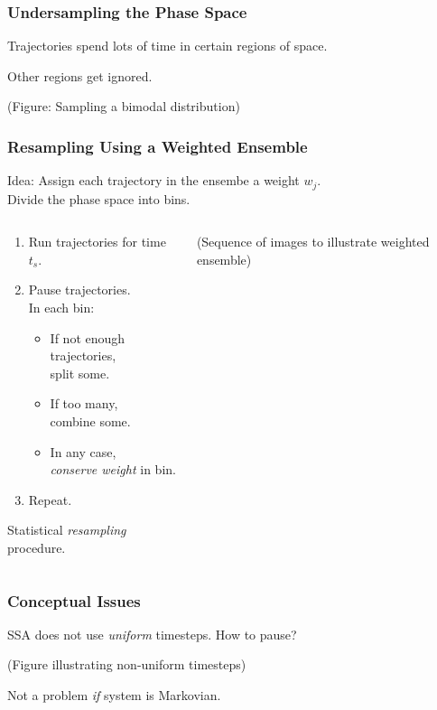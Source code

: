 \documentclass[xcolor={usenames,dvipsnames,svgnames}]{beamer}
\begin{document}
\begin{frame}
    \frametitle{Undersampling the Phase Space}
    Trajectories spend lots of time in certain regions of space.

    Other regions get ignored.

    (Figure: Sampling a bimodal distribution)
\end{frame}

\begin{frame}
    \frametitle{Resampling Using a Weighted Ensemble}
    Idea: Assign each trajectory in the ensembe a weight $w_j$.\\
    Divide the phase space into bins.
    \begin{columns}[c]
        \begin{column}{0.5\textwidth}
            \begin{enumerate}
                \item Run trajectories for time $t_s$.
                \item Pause trajectories.\\
                    In each bin:
                \pause
                \begin{itemize}
                    \item If not enough trajectories,\\
                        split some.
                    \pause
                    \item If too many,\\
                        combine some.
                    \pause
                    \item In any case,\\
                        \emph{conserve weight} in bin.
                \end{itemize}
                \pause
                \item Repeat.
            \end{enumerate}
            \pause
            Statistical \emph{resampling} procedure.
        \end{column}
        \begin{column}{0.5\textwidth}
            (Sequence of images to illustrate weighted ensemble)
        \end{column}
    \end{columns}
\end{frame}

\begin{frame}
    \frametitle{Conceptual Issues}
    SSA does not use \emph{uniform} timesteps. How to pause?

    (Figure illustrating non-uniform timesteps)

    Not a problem \emph{if} system is Markovian.
\end{frame}
\end{document}
